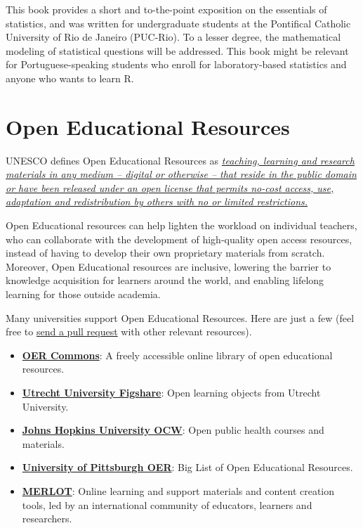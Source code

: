 \documentclass[
]{book}
\providecommand{\tightlist}{%
  \setlength{\itemsep}{0pt}\setlength{\parskip}{0pt}}
\begin{document}
This book provides a short and to-the-point exposition on the essentials of statistics, and was written for undergraduate students at the Pontifical Catholic University of Rio de Janeiro (PUC-Rio). To a lesser degree, the mathematical modeling of statistical questions will be addressed. This book might be relevant for Portuguese-speaking students who enroll for laboratory-based statistics and anyone who wants to learn R.

\chapter{Open Educational Resources}\label{open-educational-resources}

UNESCO defines Open Educational Resources as \href{https://en.unesco.org/themes/building-knowledge-societies/oer}{\emph{teaching, learning and research materials in any medium -- digital or otherwise -- that reside in the public domain or have been released under an open license that permits no-cost access, use, adaptation and redistribution by others with no or limited restrictions.}}

Open Educational resources can help lighten the workload on individual teachers, who can collaborate with the development of high-quality open access resources, instead of having to develop their own proprietary materials from scratch. Moreover, Open Educational resources are inclusive, lowering the barrier to knowledge acquisition for learners around the world, and enabling lifelong learning for those outside academia.

Many universities support Open Educational Resources. Here are just a few (feel free to \href{https://help.github.com/en/github/collaborating-with-issues-and-pull-requests/creating-a-pull-request}{send a pull request} with other relevant resources).

\begin{itemize}
\tightlist
\item
  \href{https://www.oercommons.org/}{\textbf{OER Commons}}: A freely accessible online library of open educational resources.
\item
  \href{https://uu.figshare.com/}{\textbf{Utrecht University Figshare}}: Open learning objects from Utrecht University.
\item
  \href{https://ocw.jhsph.edu/}{\textbf{Johns Hopkins University OCW}}: Open public health courses and materials.
\item
  \href{https://pitt.libguides.com/openeducation/biglist}{\textbf{University of Pittsburgh OER}}: Big List of Open Educational Resources.
\item
  \href{https://www.merlot.org/merlot/}{\textbf{MERLOT}}: Online learning and support materials and content creation tools, led by an international community of educators, learners and researchers.
\end{itemize}
\end{document}
